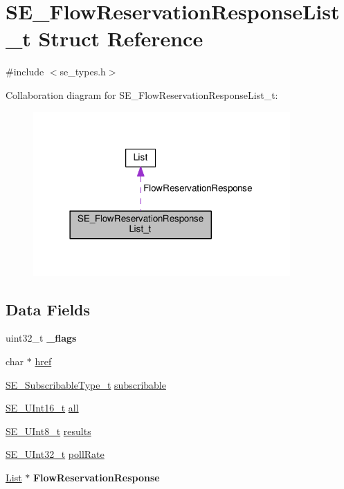 \hypertarget{structSE__FlowReservationResponseList__t}{}\section{S\+E\+\_\+\+Flow\+Reservation\+Response\+List\+\_\+t Struct Reference}
\label{structSE__FlowReservationResponseList__t}


{\ttfamily \#include $<$se\+\_\+types.\+h$>$}



Collaboration diagram for S\+E\+\_\+\+Flow\+Reservation\+Response\+List\+\_\+t\+:\nopagebreak
\begin{figure}[H]
\begin{center}
\leavevmode
\includegraphics[width=278pt]{structSE__FlowReservationResponseList__t__coll__graph}
\end{center}
\end{figure}
\subsection*{Data Fields}
\begin{DoxyCompactItemize}
\item 
uint32\+\_\+t {\bfseries \+\_\+flags}
\item 
char $\ast$ \hyperlink{group__FlowReservationResponseList_ga15fbe7db82b92d888f7ac378b6ae49ac}{href}
\item 
\hyperlink{group__SubscribableType_ga5c41f553d369710ed34619266bf2551e}{S\+E\+\_\+\+Subscribable\+Type\+\_\+t} \hyperlink{group__FlowReservationResponseList_gade27c5a37e139e3291bdf606cf6d95e9}{subscribable}
\item 
\hyperlink{group__UInt16_gac68d541f189538bfd30cfaa712d20d29}{S\+E\+\_\+\+U\+Int16\+\_\+t} \hyperlink{group__FlowReservationResponseList_ga49a6d546054984cdaccef7c6ee2908f4}{all}
\item 
\hyperlink{group__UInt8_gaf7c365a1acfe204e3a67c16ed44572f5}{S\+E\+\_\+\+U\+Int8\+\_\+t} \hyperlink{group__FlowReservationResponseList_ga7869a4d9d09d798588eeaf961dc31a25}{results}
\item 
\hyperlink{group__UInt32_ga70bd4ecda3c0c85d20779d685a270cdb}{S\+E\+\_\+\+U\+Int32\+\_\+t} \hyperlink{group__FlowReservationResponseList_ga3d1bfff63a8e2e3b3a292796427ee70f}{poll\+Rate}
\item 
\hyperlink{structList}{List} $\ast$ {\bfseries Flow\+Reservation\+Response}
\end{DoxyCompactItemize}


